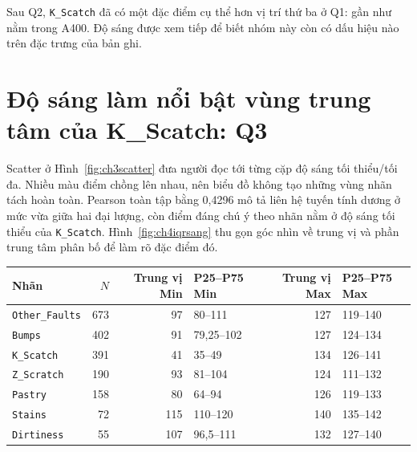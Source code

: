 \documentclass[12pt,a4paper,oneside]{report}
\newcommand{\maCot}[1]{{\urlstyle{tt}\def\UrlBreaks{\do\_\do\/\do\.}\def\UrlBigBreaks{}\nolinkurl{#1}}}
\begin{document}
Sau Q2, \maCot{K_Scatch} đã có một đặc điểm cụ thể hơn vị trí thứ ba ở Q1: gần như nằm trong A400. Độ sáng được xem tiếp để biết nhóm này còn có dấu hiệu nào trên đặc trưng của bản ghi.

\section{Độ sáng làm nổi bật vùng trung tâm của K\_Scatch: Q3}
\label{sec:ch4q3}

Scatter ở Hình~\ref{fig:ch3scatter} đưa người đọc tới từng cặp độ sáng tối thiểu/tối đa. Nhiều màu điểm chồng lên nhau, nên biểu đồ không tạo những vùng nhãn tách hoàn toàn. Pearson toàn tập bằng 0,4296 mô tả liên hệ tuyến tính dương ở mức vừa giữa hai đại lượng, còn điểm đáng chú ý theo nhãn nằm ở độ sáng tối thiểu của \maCot{K_Scatch}. Hình~\ref{fig:ch4iqrsang} thu gọn góc nhìn về trung vị và phần trung tâm phân bố để làm rõ đặc điểm đó.

\begin{center}\begin{minipage}{\linewidth}
\centering
{}
\label{fig:ch4iqrsang}
\end{minipage}\end{center}

\begin{center}\begin{minipage}{\linewidth}
\label{tab:ch4dosang}
\small{}
\begin{tabularx}{\linewidth}{@{}Y r r p{2.1cm}r p{2.1cm}@{}}
\toprule
Nhãn & $N$ & Trung vị Min & P25--P75 Min & Trung vị Max & P25--P75 Max \\
\midrule
\maCot{Other_Faults} & 673 & 97 & 80--111 & 127 & 119--140 \\
\maCot{Bumps} & 402 & 91 & 79,25--102 & 127 & 124--134 \\
\maCot{K_Scatch} & 391 & 41 & 35--49 & 134 & 126--141 \\
\maCot{Z_Scratch} & 190 & 93 & 81--104 & 124 & 111--132 \\
\maCot{Pastry} & 158 & 80 & 64--94 & 126 & 119--133 \\
\maCot{Stains} & 72 & 115 & 110--120 & 140 & 135--142 \\
\maCot{Dirtiness} & 55 & 107 & 96,5--111 & 132 & 127--140 \\
\bottomrule
\end{tabularx}
\end{minipage}\end{center}
\end{document}
